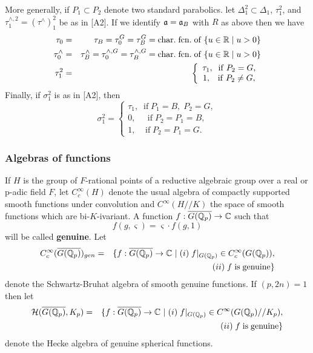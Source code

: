 More generally, if $P_1\subset P_2$ denote two standard
parabolics. let $\Delta _1^2\subset \Delta _1$, $\tau _1^2$,
and $\tau _1^{\wedge ,2}=(\tau^{\wedge })_1^2$ be as in [A2].
If we identify ${\frak{a}}={\frak{a}}_B$ with $R$
as above then we have 
\begin{eqnarray}
\tau _0 &=&\tau _B=\tau _0^G=\tau _B^G=\mathrm{char.\;fcn.\;of}
\;\{u\in {\Bbb{R}}\;|\;u>0\} \\
\tau _0^{\wedge }
&=&\tau _B^{\wedge }=\tau _0^{\wedge ,G}
=\tau _B^{\wedge,G}=\mathrm{char.\;fcn.\;of}
\;\{u\in {\Bbb{R}}\;|\;u>0\}  \nonumber \\
\tau _1^2 &=&\left\{ 
\begin{array}{c}
\tau _1,\;\;\mathrm{if}\;P_2=G, \\ 
1,\;\;\;\mathrm{if}\;P_2\neq G,
\end{array}
\right.  \nonumber
\end{eqnarray}
Finally, if $\sigma _1^2$ is as in [A2], then 
\begin{equation}
\sigma _1^2=\left\{ 
\begin{array}{c}
\tau _1,\;\;\mathrm{if}\;P_1=B,\;P_2=G, \\ 
0,\;\;\;\;\;\mathrm{if}\;P_2=P_1=B, \\ 
1,\;\;\;\;\mathrm{if}\;P_2=P_1=G.
\end{array}
\right.
\end{equation}

\subsubsection{Algebras of functions}

If $H$ is the group of $F$-rational points of a reductive algebraic group
over a real or p-adic field $F$, let $C_c^\infty (H)$ denote the usual
algebra of compactly supported smooth functions under convolution and $%
C^\infty (H//K)$ the space of smooth functions which are bi-$K$-ivariant. A
function $f:\overline{G({\Bbb{Q}}_p)}\rightarrow {\Bbb{C}}$ such that 
\begin{equation}
f(g,\varsigma )=\varsigma \cdot f(g,1)
\end{equation}
will be called \textbf{genuine}. Let 
\begin{eqnarray*}
C_c^\infty (\overline{G({\Bbb{Q}}_p)})_{gen}
&=&\{f:\overline{G({\Bbb{Q}}_p)}%
\rightarrow {\Bbb{C}}\
|\;(i)\;f|_{G({\Bbb{Q}}_p)}\in C_c^\infty (G({\Bbb{Q}}_p)),
\\
&&(ii)\;f\;\mathrm{is\;genuine}\}
\end{eqnarray*}
denote the Schwartz-Bruhat algebra of smooth genuine functions.
If $(p,2n)=1$ then let 
\begin{eqnarray*}
{\cal{H}}(\overline{G({\Bbb{Q}}_p)},K_p)
&=&\{f:\overline{G({\Bbb{Q}}_p)}\rightarrow {\Bbb{C}}
\ |\;(i)\;f|_{G({\Bbb{Q}}_p)}\in
C^\infty (G({\Bbb{Q}}_p)//K_p), \\
&&\ (ii)\;f\;\mathrm{is\;genuine}\}
\end{eqnarray*}
denote the Hecke algebra of genuine spherical functions.


